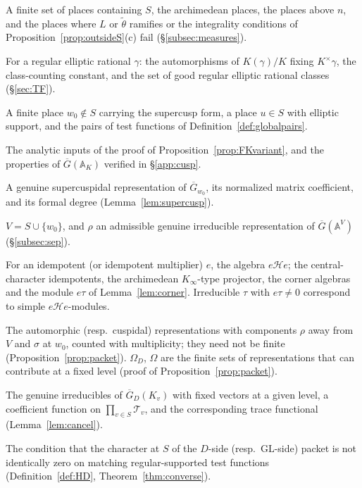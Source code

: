 \documentclass[12pt]{article}
\newcommand{\ov}[1]{\overline{#1}}
\newcommand{\A}{\mathbb{A}}
\newcommand{\GL}{\mathrm{GL}}
\newcommand{\Gb}{\ov{G}}
\newcommand{\GDb}{\ov{G}_D}
\theoremstyle{plain}
\theoremstyle{definition}
\begin{document}
\begin{description}[style=nextline,leftmargin=1.5em]
\item[$S_D$] A finite set of places containing $S$, the archimedean places, the places above $n$, and the places where $L$ or $\tilde\theta$ ramifies or the integrality conditions of Proposition~\ref{prop:outsideS}(c) fail (\S\ref{subsec:measures}).
\item[$W_\gamma$, $c(\gamma)$, $\mathcal O_H$] For a regular elliptic rational $\gamma$: the automorphisms of $K(\gamma)/K$ fixing $K^\times\gamma$, the class-counting constant, and the set of good regular elliptic rational classes (\S\ref{sec:TF}).
\item[$w_0$, $u$; admissible pair] A finite place $w_0\notin S$ carrying the supercusp form, a place $u\in S$ with elliptic support, and the pairs of test functions of Definition~\ref{def:globalpairs}.
\item[(A1), (A2); (R1)--(R5)] The analytic inputs of the proof of Proposition~\ref{prop:FKvariant}, and the properties of $\Gb(\A_K)$ verified in \S\ref{app:cusp}.
\item[$\sigma$, $\tilde f_\sigma$, $d(\sigma)$] A genuine supercuspidal representation of $\Gb_{w_0}$, its normalized matrix coefficient, and its formal degree (Lemma~\ref{lem:supercusp}).
\item[$V$, $\rho$] $V=S\cup\{w_0\}$, and $\rho$ an admissible genuine irreducible representation of $\Gb(\A^V)$ (\S\ref{subsec:sep}).
\item[Corner Hecke algebra; $e_v$, $e_{\mathfrak t}$, $A_v$, $A_\infty$, $A$, $e\tau$] For an idempotent (or idempotent multiplier) $e$, the algebra $e\mathcal He$; the central-character idempotents, the archimedean $K_\infty$-type projector, the corner algebras and the module $e\tau$ of Lemma~\ref{lem:corner}. Irreducible $\tau$ with $e\tau\ne0$ correspond to simple $e\mathcal He$-modules.
\item[Near-equivalence packets $P_D(\rho)$, $P(\rho)$] The automorphic (resp.\ cuspidal) representations with components $\rho$ away from $V$ and $\sigma$ at $w_0$, counted with multiplicity; they need not be finite (Proposition~\ref{prop:packet}). $\Omega_D$, $\Omega$ are the finite sets of representations that can contribute at a fixed level (proof of Proposition~\ref{prop:packet}).
\item[$\mathcal T_v$, $a$, $\Lambda_a$] The genuine irreducibles of $\GDb(K_v)$ with fixed vectors at a given level, a coefficient function on $\prod_{v\in S}\mathcal T_v$, and the corresponding trace functional (Lemma~\ref{lem:cancel}).
\item[$(\mathrm H_D)$, (H); elliptic detectability] The condition that the character at $S$ of the $D$-side (resp.\ $\GL$-side) packet is not identically zero on matching regular-supported test functions (Definition~\ref{def:HD}, Theorem~\ref{thm:converse}).

\end{description}
\end{document}

